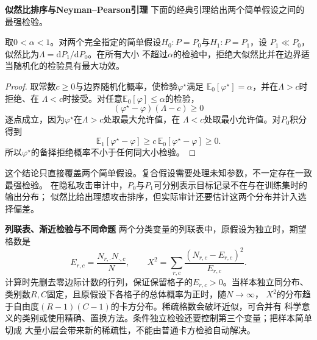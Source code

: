 \par\medskip\noindent\textbf{似然比排序与Neyman–Pearson引理}\quad
下面的经典引理给出两个简单假设之间的最强检验。
\begin{theorem}
\label{thm:statistics-neyman-pearson}
取\(0<\alpha<1\)。对两个完全指定的简单假设\(H_0:P=P_0\)与\(H_1:P=P_1\)，设
\(P_1\ll P_0\)，似然比为\(\Lambda=\mathrm dP_1/\mathrm dP_0\)。在所有大小
不超过\(\alpha\)的检验中，拒绝大似然比并在边界适当随机化的检验具有最大功效。
\end{theorem}

\begin{proof}
取常数\(c\geq0\)与边界随机化概率，使检验\(\varphi^\star\)满足
\(\mathbb{E}_0[\varphi^\star]=\alpha\)，并在\(\Lambda>c\)时拒绝、在
\(\Lambda<c\)时接受。对任意\(\mathbb{E}_0[\varphi]\leq\alpha\)的检验，
\[
  (\varphi^\star-\varphi)(\Lambda-c)\geq0
\]
逐点成立，因为\(\varphi^\star\)在\(\Lambda>c\)处取最大允许值，在
\(\Lambda<c\)处取最小允许值。对\(P_0\)积分得到
\[
  \mathbb{E}_1[\varphi^\star-\varphi]
  \geq c\,\mathbb{E}_0[\varphi^\star-\varphi]\geq0.
\]
所以\(\varphi^\star\)的备择拒绝概率不小于任何同大小检验。
\end{proof}

这个结论只直接覆盖两个简单假设。复合假设需要处理未知参数，不一定存在一致最强检验。
在隐私攻击审计中，\(P_0\)与\(P_1\)可分别表示目标记录不在与在训练集时的输出分布；
似然比给出理想攻击排序，但实际审计还要估计这两个分布并计入选择偏差。

\par\medskip\noindent\textbf{列联表、渐近检验与不同命题}\quad
两个分类变量的列联表中，原假设为独立时，期望格数是
\[
  E_{r,c}=\frac{N_{r,\cdot}N_{\cdot,c}}{N},\qquad
  X^2=\sum_{r,c}\frac{(N_{r,c}-E_{r,c})^2}{E_{r,c}}.
\]
计算时先删去零边际计数的行列，保证保留格子的\(E_{r,c}>0\)。当样本独立同分布、类别数\(R,C\)固定，且原假设下各格子的总体概率为正时，随\(N\to\infty\)，
\(X^2\)的分布趋于自由度\((R-1)(C-1)\)的卡方分布。稀疏格数会破坏近似，可合并有
科学意义的类别或使用精确、置换方法。条件独立检验还要控制第三个变量；把样本简单切成
大量小层会带来新的稀疏性，不能由普通卡方检验自动解决。

